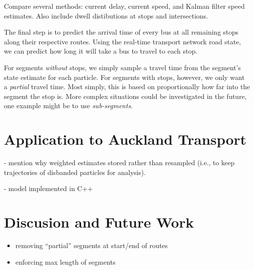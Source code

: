 \documentclass[draftcls,a4paper,onecolumn]{IEEEtran}\usepackage[]{graphicx}\usepackage[]{color}
\begin{document}
Compare several methods:
current delay, current speed, and Kalman filter speed estimates.
Also include dwell distibutions at stops and intersections.


The final step is to predict the arrival time of every bus 
at all remaining stops along their respective routes.
Using the real-time transport network road state, 
we can predict how long it will take a bus to travel 
to each stop.


For segments \emph{without} stops,
we simply sample a travel time from the segment's state estimate
for each particle.
For segments with stops, however,
we only want a \emph{partial} travel time.
Most simply, this is based on proportionally how far into the segment
the stop is.
More complex situations could be investigated in the future,
one example might be to use \emph{sub-segments}.



\section{Application to Auckland Transport}
\label{sec:results}

- mention why weighted estimates stored rather than resampled 
(i.e., to keep trajectories of disbanded particles for analysis).

- model implemented in C++


\section{Discusion and Future Work}
\label{sec:discussion}

\begin{itemize}
\item removing ``partial'' segments at start/end of routes
\item enforcing max length of segments
\end{itemize}






\end{document}
